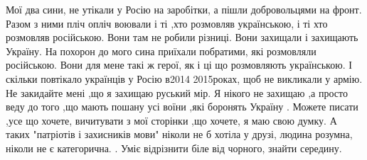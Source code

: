 \begin{itemize}
\begin{itemize}
Мої два сини, не утікали у Росію на заробітки, а пішли добровольцями на фронт.
Разом з ними пліч опліч воювали і ті ,хто розмовляв українською, і ті хто
розмовляв російською. Вони там не робили різниці. Вони захищали і захищають
Україну. На похорон до мого сина приїхали побратими, які розмовляли російською.
Вони для мене такі ж герої, як і ці що розмовляють українською. І скільки
повтікало українців у Росію в2014 2015роках, щоб не викликали у армію. Не
закидайте мені ,що я захищаю руський мір. Я нікого не захищаю ,а просто веду до
того ,що мають пошану усі воїни ,які боронять Україну . Можете писати ,усе що
хочете, вичитувати з мої сторінки ,що хочете, я маю свою думку. А таких
"патріотів і захисників мови" ніколи не б хотіла у друзі, людина розумна,
ніколи не є категорична. . Уміє відрізнити біле від чорного, знайти середину.

\end{itemize} %

\end{itemize} %

